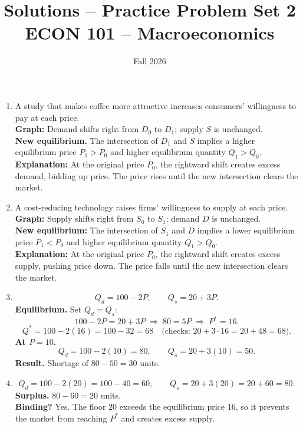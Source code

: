 \documentclass[12pt]{article}
\title{Solutions -- Practice Problem Set 2\\ \vspace{15pt} \large ECON 101 -- Macroeconomics}
\author{}
\date{Fall 2026}
\begin{document}
\maketitle



\begin{enumerate}

\item
A study that makes coffee more attractive increases consumers' willingness to pay at each price.\\
\textbf{Graph:} Demand shifts right from $D_0$ to $D_1$; supply $S$ is unchanged.\\
\textbf{New equilibrium.} The intersection of $D_1$ and $S$ implies a higher equilibrium price $P_1>P_0$ and higher equilibrium quantity $Q_1>Q_0$.\\
\textbf{Explanation:} At the original price $P_0$, the rightward shift creates excess demand, bidding up price. The price rises until the new intersection clears the market.

\item
 A cost-reducing technology raises firms' willingness to supply at each price.\\
\textbf{Graph:} Supply shifts right from $S_0$ to $S_1$; demand $D$ is unchanged.\\
\textbf{New equilibrium:} The intersection of $S_1$ and $D$ implies a lower equilibrium price $P_1<P_0$ and higher equilibrium quantity $Q_1>Q_0$.\\
\textbf{Explanation:} At the original price $P_0$, the rightward shift creates excess supply, pushing price down. The price falls until the new intersection clears the market.

\item
\[
Q_d=100-2P, \qquad Q_s=20+3P.
\]
\textbf{Equilibrium.} Set $Q_d=Q_s$:
\[
100-2P=20+3P \;\Rightarrow\; 80=5P \;\Rightarrow\; P^\ast=16.
\]
\[
Q^\ast=100-2(16)=100-32=68 \quad \text{(checks: }20+3\cdot 16=20+48=68\text{)}.
\]
\textbf{At $P=10$.} 
\[
Q_d=100-2(10)=80, \qquad Q_s=20+3(10)=50.
\]
\textbf{Result.} \;Shortage of $80-50=30$ units.

\item
\[
Q_d=100-2(20)=100-40=60, \qquad Q_s=20+3(20)=20+60=80.
\]
\textbf{Surplus.} \; $80-60=20$ units.\\
\textbf{Binding?} Yes. The floor $20$ exceeds the equilibrium price $16$, so it prevents the market from reaching $P^\ast$ and creates excess supply.


\end{enumerate}
\end{document}
